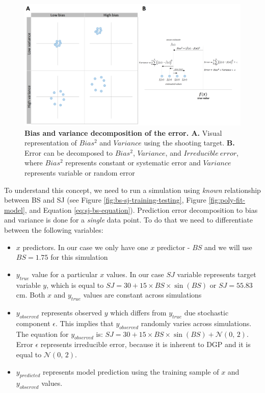 \documentclass[
]{book}
\providecommand{\tightlist}{%
  \setlength{\itemsep}{0pt}\setlength{\parskip}{0pt}}
\begin{document}
\begin{figure}

{\centering \includegraphics[width=1\linewidth]{figures/bias-variance} 

}

\caption{\textbf{Bias and variance decomposition of the error. A. }Visual representation of \(Bias^2\) and \(Variance\) using the shooting target. \textbf{B.} Error can be decomposed to \(Bias^2\), \(Variance\), and \(Irreducible \: error\), where \(Bias^2\) represents constant or systematic error and \(Variance\) represents variable or random error}\label{fig:bias-variance}
\end{figure}



To understand this concept, we need to run a simulation using \emph{known} relationship between BS and SJ (see Figure \ref{fig:bs-sj-training-testing}, Figure \ref{fig:poly-fit-model}, and Equation \eqref{eq:sj-bs-equation}). Prediction error decomposition to bias and variance is done for a \emph{single} data point. To do that we need to differentiate between the following variables:

\begin{itemize}
\tightlist
\item
  \(x\) predictors. In our case we only have one \(x\) predictor - \(BS\) and we will use \(BS = 1.75\) for this simulation
\item
  \(y_{true}\) value for a particular \(x\) values. In our case \(SJ\) variable represents target variable \(y\), which is equal to \(SJ = 30 + 15\times BS\times\sin(BS)\) or \(SJ=55.83\)cm. Both \(x\) and \(y_{true}\) values are constant across simulations
\item
  \(y_{observed}\) represents observed \(y\) which differs from \(y_{true}\) due stochastic component \(\epsilon\). This implies that \(y_{observed}\) randomly varies across simulations. The equation for \(y_{observed}\) is: \(SJ = 30 + 15\times BS\times\sin(BS) + \mathcal{N}(0,\,2)\). Error \(\epsilon\) represents irreducible error, because it is inherent to DGP and it is equal to \(\mathcal{N}(0,\,2)\).
\item
  \(y_{predicted}\) represents model prediction using the training sample of \(x\) and \(y_{observed}\) values.
\end{itemize}
\end{document}
